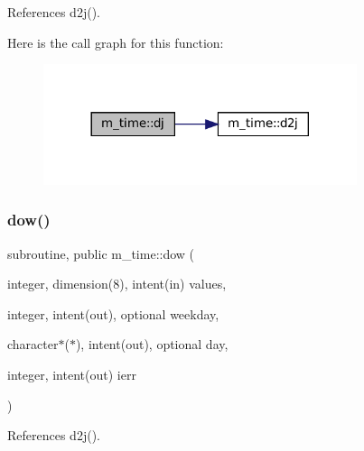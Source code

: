 References d2j().

Here is the call graph for this function\+:\nopagebreak
\begin{figure}[H]
\begin{center}
\leavevmode
\includegraphics[width=260pt]{namespacem__time_ad3ce73217cd51090b52a0468b045c0f3_cgraph}
\end{center}
\end{figure}
\mbox{\label{namespacem__time_adfda8a89820b8d0ad4581a14896e4ce5}} 
\subsubsection{\texorpdfstring{dow()}{dow()}}
{\footnotesize\ttfamily subroutine, public m\+\_\+time\+::dow (\begin{DoxyParamCaption}\item[{integer, dimension(8), intent(in)}]{values,  }\item[{integer, intent(out), optional}]{weekday,  }\item[{character$\ast$($\ast$), intent(out), optional}]{day,  }\item[{integer, intent(out)}]{ierr }\end{DoxyParamCaption})}



References d2j().

